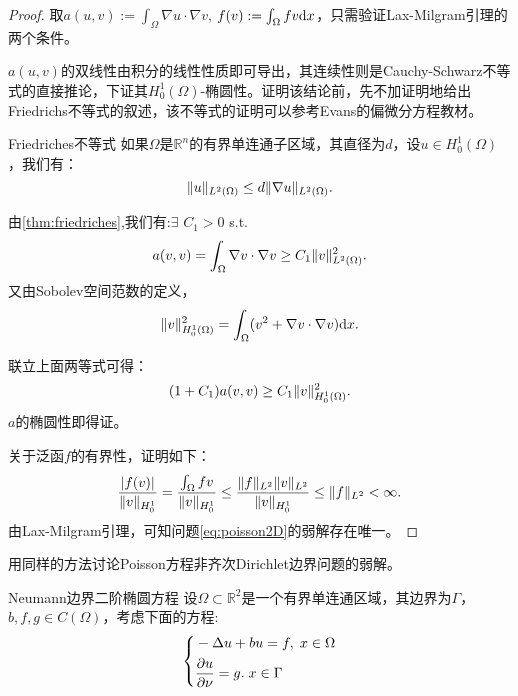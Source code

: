 \begin{proof}
  取$a(u,v):=\int_{\Omega}\nabla u\cdot\nabla v$, $f(v):=\int_{\Omega}fv\mathrm{d} x$，只需验证Lax-Milgram引理的两个条件。

  $a(u,v)$的双线性由积分的线性性质即可导出，其连续性则是Cauchy-Schwarz不等式的直接推论，下证其$H_{0}^{1}(\Omega)$-椭圆性。证明该结论前，先不加证明地给出Friedrichs不等式的叙述，该不等式的证明可以参考Evans的偏微分方程教材。
  \begin{proposition}{Friedriches不等式}
    \label{thm:friedriches}
    如果$\Omega$是$\mathbb{R}^{n}$的有界单连通子区域，其直径为$d$，设$u\in H_{0}^{1}(\Omega)$，我们有：
    \begin{equation}
      \|u\|_{L^{2}(\Omega)}\le d\|\nabla u\|_{L^{2}(\Omega)}.
    \end{equation}
  \end{proposition}
  由\ref{thm:friedriches},我们有:$\exists$ $C_{1}>0$ s.t. 
  \begin{equation}
    a(v,v)=\int_{\Omega}\nabla v\cdot\nabla v\ge C_{1}\|v\|_{L^{2}(\Omega)}^{2}.
  \end{equation}
  又由Sobolev空间范数的定义，
  \begin{equation}
    \|v\|_{H_{0}^{1}(\Omega)}^{2}=\int_{\Omega}(v^{2}+\nabla v\cdot\nabla v)\mathrm{d} x.
  \end{equation}

  联立上面两等式可得：
  \begin{equation}
    (1+C_{1})a(v,v)\ge C_{1}\|v\|_{H_{0}^{1}(\Omega)}^{2}.
  \end{equation}
  $a$的椭圆性即得证。

  关于泛函$f$的有界性，证明如下：
  \begin{equation}
    \frac{|f(v)|}{\|v\|_{H_{0}^{1}}}=\frac{\int_{\Omega}fv}{\|v\|_{H_{0}^{1}}}\le\frac{\|f\|_{L^{2}}\|v\|_{L^{2}}}{\|v\|_{H_{0}^{1}}}\le\|f\|_{L^{2}}<\infty.
  \end{equation}
  由Lax-Milgram引理，可知问题\eqref{eq:poisson2D}的弱解存在唯一。
\end{proof}
\begin{exercise}
  用同样的方法讨论Poisson方程非齐次Dirichlet边界问题的弱解。
\end{exercise}
\begin{definition}{Neumann边界二阶椭圆方程}
  设$\Omega\subset\mathbb{R}^{2}$是一个有界单连通区域，其边界为$\Gamma$，$b,f,g\in C(\Omega)$，考虑下面的方程:
  \begin{equation}
    \label{eq:ellipticNeumann}
    \left\{
      \begin{aligned}
      &-\Delta u+bu=f,\; x\in\Omega\\
      &\frac{\partial u}{\partial \nu}=g.\; x\in\Gamma\\
      \end{aligned}
    \right.
  \end{equation}
\end{definition}
